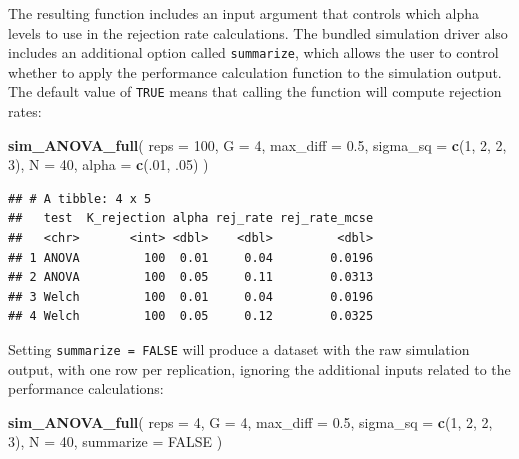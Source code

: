 \documentclass[
]{book}
\newenvironment{Shaded}{\begin{snugshade}}{\end{snugshade}}
\newcommand{\AttributeTok}[1]{\textcolor[rgb]{0.13,0.29,0.53}{#1}}
\newcommand{\ConstantTok}[1]{\textcolor[rgb]{0.56,0.35,0.01}{#1}}
\newcommand{\DecValTok}[1]{\textcolor[rgb]{0.00,0.00,0.81}{#1}}
\newcommand{\FloatTok}[1]{\textcolor[rgb]{0.00,0.00,0.81}{#1}}
\newcommand{\FunctionTok}[1]{\textcolor[rgb]{0.13,0.29,0.53}{\textbf{#1}}}
\newcommand{\NormalTok}[1]{#1}
\begin{document}
The resulting function includes an input argument that controls which alpha levels to use in the rejection rate calculations.
The bundled simulation driver also includes an additional option called \texttt{summarize}, which allows the user to control whether to apply the performance calculation function to the simulation output.
The default value of \texttt{TRUE} means that calling the function will compute rejection rates:

\begin{Shaded}
\begin{Highlighting}[]
\FunctionTok{sim\_ANOVA\_full}\NormalTok{(}
  \AttributeTok{reps =} \DecValTok{100}\NormalTok{, }\AttributeTok{G =} \DecValTok{4}\NormalTok{, }\AttributeTok{max\_diff =} \FloatTok{0.5}\NormalTok{, }
  \AttributeTok{sigma\_sq =} \FunctionTok{c}\NormalTok{(}\DecValTok{1}\NormalTok{, }\DecValTok{2}\NormalTok{, }\DecValTok{2}\NormalTok{, }\DecValTok{3}\NormalTok{), }\AttributeTok{N =} \DecValTok{40}\NormalTok{, }
  \AttributeTok{alpha =} \FunctionTok{c}\NormalTok{(.}\DecValTok{01}\NormalTok{, .}\DecValTok{05}\NormalTok{)}
\NormalTok{)}
\end{Highlighting}
\end{Shaded}

\begin{verbatim}
## # A tibble: 4 x 5
##   test  K_rejection alpha rej_rate rej_rate_mcse
##   <chr>       <int> <dbl>    <dbl>         <dbl>
## 1 ANOVA         100  0.01     0.04        0.0196
## 2 ANOVA         100  0.05     0.11        0.0313
## 3 Welch         100  0.01     0.04        0.0196
## 4 Welch         100  0.05     0.12        0.0325
\end{verbatim}

Setting \texttt{summarize\ =\ FALSE} will produce a dataset with the raw simulation output, with one row per replication, ignoring the additional inputs related to the performance calculations:

\begin{Shaded}
\begin{Highlighting}[]
\FunctionTok{sim\_ANOVA\_full}\NormalTok{(}
  \AttributeTok{reps =} \DecValTok{4}\NormalTok{, }\AttributeTok{G =} \DecValTok{4}\NormalTok{, }\AttributeTok{max\_diff =} \FloatTok{0.5}\NormalTok{, }
  \AttributeTok{sigma\_sq =} \FunctionTok{c}\NormalTok{(}\DecValTok{1}\NormalTok{, }\DecValTok{2}\NormalTok{, }\DecValTok{2}\NormalTok{, }\DecValTok{3}\NormalTok{), }\AttributeTok{N =} \DecValTok{40}\NormalTok{, }
  \AttributeTok{summarize =} \ConstantTok{FALSE}
\NormalTok{)}
\end{Highlighting}
\end{Shaded}
\end{document}
